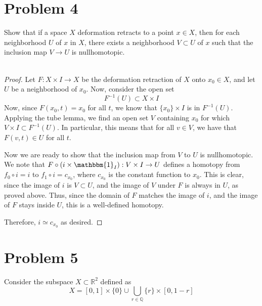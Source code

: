 \documentclass[fontsize=11pt]{scrartcl} %
\numberwithin{equation}{section} %
\numberwithin{figure}{section} %
\numberwithin{table}{section} %
\newcommand{\R}{\mathbb{R}}
\newcommand{\Q}{\mathbb{Q}}
\begin{document}
\section*{Problem 4} %
Show that if a space $X$ deformation retracts to a point $x\in X$, then for each
neighborhood $U$ of $x$ in $X$, there exists a neighborhood $V\subset U$ of $x$
such that the inclusion map $V\to U$ is nullhomotopic.
\\
\\
\begin{proof}
    Let $F:X\times I\to X$ be the deformation retraction of $X$ onto $x_0\in X$,
    and let $U$ be a neighborhood of $x_0$. Now, consider the open set
    \[
        F^{-1}(U)\subset X\times I
    \]
    Now, since $F(x_0,t) = x_0$ for all $t$, we know that $\{x_0\}\times I$ is
    in $F^{-1}(U)$. Applying the tube lemma, we find an open set $V$ containing
    $x_0$ for which $V\times I\subset F^{-1}(U)$. In particular, this means that
    for all $v\in V$, we have that $F(v,t)\in U$ for all $t$.

    Now we are ready to show that the inclusion map from $V$ to $U$ is
    nullhomotopic. We note that $F\circ(i\times \mathbbm{1}_I):V\times I\to U$
    defines a homotopy from $f_0\circ i = i$ to $f_1\circ i = c_{x_0}$, where
    $c_{x_0}$ is the constant function to $x_0$. This is clear, since the image
    of $i$ is $V\subset U$, and the image of $V$ under $F$ is always in $U$, as
    proved above. Thus, since the domain of $F$ matches the image of $i$, and
    the image of $F$ stays inside $U$, this is a well-defined homotopy.

    Therefore, $i\simeq c_{x_0}$ as desired.
\end{proof}

\section*{Problem 5} %
Consider the subspace $X\subset \R^2$ defined as
\[
    X = [0,1]\times\{0\} \cup \bigcup_{r\in\Q}\{r\}\times[0,1-r]
\]
\end{document}
